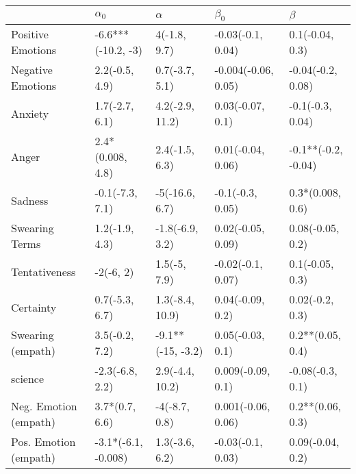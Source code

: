 \begin{tabular}{lllll}
\toprule
{} &           $\alpha_0$ &           $\alpha$ &            $\beta_0$ &              $\beta$ \\
\midrule
Positive Emotions     &   -6.6***(-10.2, -3) &       4(-1.8, 9.7) &    -0.03(-0.1, 0.04) &      0.1(-0.04, 0.3) \\
Negative Emotions     &       2.2(-0.5, 4.9) &     0.7(-3.7, 5.1) &  -0.004(-0.06, 0.05) &    -0.04(-0.2, 0.08) \\
Anxiety               &       1.7(-2.7, 6.1) &    4.2(-2.9, 11.2) &     0.03(-0.07, 0.1) &     -0.1(-0.3, 0.04) \\
Anger                 &     2.4*(0.008, 4.8) &     2.4(-1.5, 6.3) &    0.01(-0.04, 0.06) &  -0.1**(-0.2, -0.04) \\
Sadness               &      -0.1(-7.3, 7.1) &     -5(-16.6, 6.7) &     -0.1(-0.3, 0.05) &     0.3*(0.008, 0.6) \\
Swearing Terms        &       1.2(-1.9, 4.3) &    -1.8(-6.9, 3.2) &    0.02(-0.05, 0.09) &     0.08(-0.05, 0.2) \\
Tentativeness         &            -2(-6, 2) &       1.5(-5, 7.9) &    -0.02(-0.1, 0.07) &      0.1(-0.05, 0.3) \\
Certainty             &       0.7(-5.3, 6.7) &    1.3(-8.4, 10.9) &     0.04(-0.09, 0.2) &      0.02(-0.2, 0.3) \\
Swearing (empath)     &       3.5(-0.2, 7.2) &  -9.1**(-15, -3.2) &     0.05(-0.03, 0.1) &     0.2**(0.05, 0.4) \\
science               &      -2.3(-6.8, 2.2) &    2.9(-4.4, 10.2) &    0.009(-0.09, 0.1) &     -0.08(-0.3, 0.1) \\
Neg. Emotion (empath) &       3.7*(0.7, 6.6) &      -4(-8.7, 0.8) &   0.001(-0.06, 0.06) &     0.2**(0.06, 0.3) \\
Pos. Emotion (empath) &  -3.1*(-6.1, -0.008) &     1.3(-3.6, 6.2) &    -0.03(-0.1, 0.03) &     0.09(-0.04, 0.2) \\
\bottomrule
\end{tabular}
